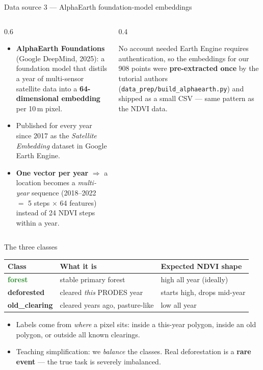 \documentclass[aspectratio=169,11pt]{beamer}
\newcommand{\gtag}[1]{{\color{forestgreen}\textbf{#1}}}
\begin{document}
\begin{frame}{Data source 3 — AlphaEarth foundation-model embeddings}
  \begin{columns}[T]
    \begin{column}{0.6\textwidth}
      \begin{itemize}
        \item \textbf{AlphaEarth Foundations} (Google DeepMind, 2025): a
              foundation model that distils a year of multi-sensor satellite
              data into a \gtag{64-dimensional embedding} per 10\,m pixel.
        \item Published for every year since 2017 as the \emph{Satellite
              Embedding} dataset in Google Earth Engine.
        \item \textbf{One vector per year} $\Rightarrow$ a location becomes a
              \emph{multi-year} sequence (2018--2022 $=$ 5 steps $\times$ 64
              features) instead of 24 NDVI steps within a year.
      \end{itemize}
    \end{column}
    \begin{column}{0.4\textwidth}
      \begin{exampleblock}{No account needed}
        Earth Engine requires authentication, so the embeddings for our 908
        points were \textbf{pre-extracted once} by the tutorial authors
        (\texttt{data\_prep/build\_alphaearth.py}) and shipped as a small CSV
        — same pattern as the NDVI data.
      \end{exampleblock}
    \end{column}
  \end{columns}
\end{frame}

\begin{frame}{The three classes}
  \centering
  \begin{tabular}{@{}lll@{}}
    \toprule
    \textbf{Class} & \textbf{What it is} & \textbf{Expected NDVI shape} \\
    \midrule
    \textcolor{forestgreen}{\textbf{forest}} & stable primary forest &
      high all year (ideally) \\
    \textcolor{clearred}{\textbf{deforested}} & cleared \emph{this} PRODES year &
      starts high, \alert{drops} mid-year \\
    \textcolor{pastureyellow}{\textbf{old\_clearing}} & cleared years ago,
      pasture-like & low all year \\
    \bottomrule
  \end{tabular}
  \vspace{1em}
  \begin{itemize}
    \item Labels come from \emph{where} a pixel sits: inside a this-year polygon,
          inside an old polygon, or outside all known clearings.
    \item \alert{Teaching simplification:} we \emph{balance} the classes.
          Real deforestation is a \textbf{rare event} — the true task is
          severely imbalanced.
  \end{itemize}
\end{frame}
\end{document}

